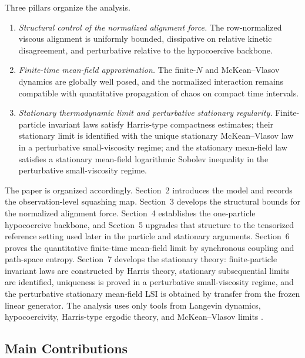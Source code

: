\documentclass[11pt]{article}
\theoremstyle{definition}
\theoremstyle{remark}
\begin{document}
Three pillars organize the analysis.

\begin{enumerate}[leftmargin=1.5em]
\item \emph{Structural control of the normalized alignment force.}
The row-normalized viscous alignment is uniformly bounded, dissipative on
relative kinetic disagreement, and perturbative relative to the hypocoercive
backbone.
\item \emph{Finite-time mean-field approximation.}
The finite-$N$ and McKean--Vlasov dynamics are globally well posed, and the
normalized interaction remains compatible with quantitative propagation of
chaos on compact time intervals.
\item \emph{Stationary thermodynamic limit and perturbative stationary
regularity.}
Finite-particle invariant laws satisfy Harris-type compactness estimates; their
stationary limit is identified with the unique stationary McKean--Vlasov law in
a perturbative small-viscosity regime; and the stationary mean-field law
satisfies a stationary mean-field logarithmic Sobolev inequality in the
perturbative small-viscosity regime.
\end{enumerate}

The paper is organized accordingly. Section~2 introduces the model and records
the observation-level squashing map. Section~3 develops the structural bounds
for the normalized alignment force. Section~4 establishes the one-particle
hypocoercive backbone, and Section~5 upgrades that structure to the tensorized
reference setting used later in the particle and stationary arguments.
Section~6 proves the quantitative finite-time mean-field limit by synchronous
coupling and path-space entropy. Section~7 develops the stationary theory:
finite-particle invariant laws are constructed by Harris theory, stationary
subsequential limits are identified, uniqueness is proved in a perturbative
small-viscosity regime, and the perturbative stationary mean-field LSI is
obtained by transfer from the frozen linear generator. The analysis uses only
tools from Langevin dynamics,
hypocoercivity, Harris-type ergodic theory, and McKean--Vlasov limits
\cite{roberts1996exponential,meyn2012markov,villani2009hypocoercivity,sznitman1991topics}.

\subsection*{Main Contributions}
\end{document}
